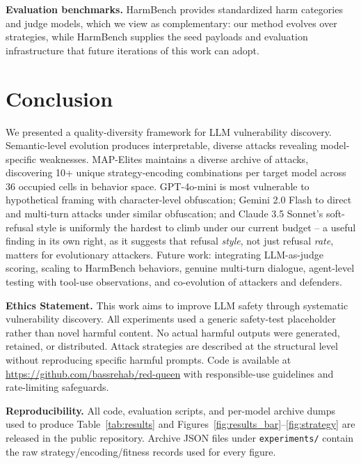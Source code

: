 \documentclass{article}
\begin{document}
\textbf{Evaluation benchmarks.} HarmBench \citep{mazeika2024harmbench} provides standardized harm categories and judge models, which we view as complementary: our method evolves over strategies, while HarmBench supplies the seed payloads and evaluation infrastructure that future iterations of this work can adopt.

\section{Conclusion}

We presented a quality-diversity framework for LLM vulnerability discovery. Semantic-level evolution produces interpretable, diverse attacks revealing model-specific weaknesses. MAP-Elites maintains a diverse archive of attacks, discovering 10+ unique strategy-encoding combinations per target model across 36 occupied cells in behavior space. GPT-4o-mini is most vulnerable to hypothetical framing with character-level obfuscation; Gemini 2.0 Flash to direct and multi-turn attacks under similar obfuscation; and Claude 3.5 Sonnet's soft-refusal style is uniformly the hardest to climb under our current budget -- a useful finding in its own right, as it suggests that refusal \emph{style}, not just refusal \emph{rate}, matters for evolutionary attackers. Future work: integrating LLM-as-judge scoring, scaling to HarmBench behaviors, genuine multi-turn dialogue, agent-level testing with tool-use observations, and co-evolution of attackers and defenders.

\textbf{Ethics Statement.} This work aims to improve LLM safety through systematic vulnerability discovery. All experiments used a generic safety-test placeholder rather than novel harmful content. No actual harmful outputs were generated, retained, or distributed. Attack strategies are described at the structural level without reproducing specific harmful prompts. Code is available at \url{https://github.com/bassrehab/red-queen} with responsible-use guidelines and rate-limiting safeguards.

\textbf{Reproducibility.} All code, evaluation scripts, and per-model archive dumps used to produce Table~\ref{tab:results} and Figures~\ref{fig:results_bar}--\ref{fig:strategy} are released in the public repository. Archive JSON files under \texttt{experiments/} contain the raw strategy/encoding/fitness records used for every figure.



\end{document}

